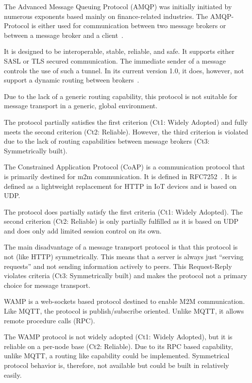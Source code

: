 The Advanced Message Queuing Protocol (AMQP) was initially initiated by numerous exponents based mainly on finance-related industries. The AMQP-Protocol is either used for communication between two message brokers or between a message broker and a client~\cite{amqp}.

It is designed to be interoperable, stable, reliable, and safe. It supports either SASL or TLS secured communication. The immediate sender of a message controls the use of such a tunnel. In its current version 1.0, it does, however, not support a dynamic routing between brokers~\cite{amqp}.

Due to the lack of a generic routing capability, this protocol is not suitable for message transport in a generic, global environment.

The protocol partially satisfies the first criterion (Ct1: Widely Adopted) and fully meets the second criterion (Ct2: Reliable). However, the third criterion is violated due to the lack of routing capabilities between message brokers (Ct3: Symmetrically built).

The Constrained Application Protocol (CoAP) is a communication protocol that is primarily destined for m2m communication. It is defined in RFC7252~\cite{rfc7252}.  It is defined as a lightweight replacement for HTTP in IoT devices and is based on UDP.

The protocol does partially satisfy the first criteria (Ct1: Widely Adopted). The second criterion (Ct2: Reliable) is only partially fulfilled as it is based on UDP and does only add limited session control on its own.

The main disadvantage of a message transport protocol is that this protocol is not (like HTTP) symmetrically. This means that a server is always just ``serving requests'' and not sending information actively to peers. This Request-Reply violates criteria (Ct3: Symmetrically built) and makes the protocol not a primary choice for message transport. 

WAMP is a web-sockets based protocol destined to enable M2M communication. Like MQTT, the protocol is publish/subscribe oriented. Unlike MQTT, it allows remote procedure calls (RPC).

The WAMP protocol is not widely adopted (Ct1: Widely Adopted), but it is reliable on a per-node base (Ct2: Reliable). Due to its RPC based capability, unlike MQTT, a routing like capability could be implemented. Symmetrical protocol behavior is, therefore, not available but could be built in relatively easily.

